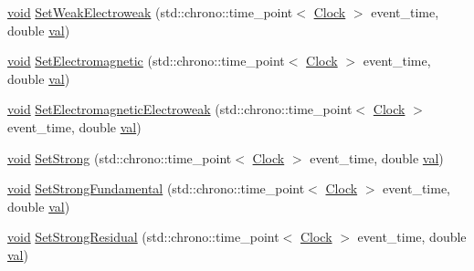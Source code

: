 \begin{DoxyCompactItemize}
\item 
\mbox{\hyperlink{glad_8h_a950fc91edb4504f62f1c577bf4727c29}{void}} \mbox{\hyperlink{class_composite_force_particle_a73a3792ae1c334e74f945fea56083f0b}{Set\+Weak\+Electroweak}} (std\+::chrono\+::time\+\_\+point$<$ \mbox{\hyperlink{universe_8h_a0ef8d951d1ca5ab3cfaf7ab4c7a6fd80}{Clock}} $>$ event\+\_\+time, double \mbox{\hyperlink{glad_8h_a26942fd2ed566ef553eae82d2c109c8f}{val}})
\item 
\mbox{\hyperlink{glad_8h_a950fc91edb4504f62f1c577bf4727c29}{void}} \mbox{\hyperlink{class_composite_force_particle_a476c0d570c3be75c9e186df1ec2a5cda}{Set\+Electromagnetic}} (std\+::chrono\+::time\+\_\+point$<$ \mbox{\hyperlink{universe_8h_a0ef8d951d1ca5ab3cfaf7ab4c7a6fd80}{Clock}} $>$ event\+\_\+time, double \mbox{\hyperlink{glad_8h_a26942fd2ed566ef553eae82d2c109c8f}{val}})
\item 
\mbox{\hyperlink{glad_8h_a950fc91edb4504f62f1c577bf4727c29}{void}} \mbox{\hyperlink{class_composite_force_particle_ad53c5d396b3c56241174a9bd78f9e07a}{Set\+Electromagnetic\+Electroweak}} (std\+::chrono\+::time\+\_\+point$<$ \mbox{\hyperlink{universe_8h_a0ef8d951d1ca5ab3cfaf7ab4c7a6fd80}{Clock}} $>$ event\+\_\+time, double \mbox{\hyperlink{glad_8h_a26942fd2ed566ef553eae82d2c109c8f}{val}})
\item 
\mbox{\hyperlink{glad_8h_a950fc91edb4504f62f1c577bf4727c29}{void}} \mbox{\hyperlink{class_composite_force_particle_a06488ef0457335648b161d3ed746b643}{Set\+Strong}} (std\+::chrono\+::time\+\_\+point$<$ \mbox{\hyperlink{universe_8h_a0ef8d951d1ca5ab3cfaf7ab4c7a6fd80}{Clock}} $>$ event\+\_\+time, double \mbox{\hyperlink{glad_8h_a26942fd2ed566ef553eae82d2c109c8f}{val}})
\item 
\mbox{\hyperlink{glad_8h_a950fc91edb4504f62f1c577bf4727c29}{void}} \mbox{\hyperlink{class_composite_force_particle_a28d835658edcbecf60162475a8cb1ab6}{Set\+Strong\+Fundamental}} (std\+::chrono\+::time\+\_\+point$<$ \mbox{\hyperlink{universe_8h_a0ef8d951d1ca5ab3cfaf7ab4c7a6fd80}{Clock}} $>$ event\+\_\+time, double \mbox{\hyperlink{glad_8h_a26942fd2ed566ef553eae82d2c109c8f}{val}})
\item 
\mbox{\hyperlink{glad_8h_a950fc91edb4504f62f1c577bf4727c29}{void}} \mbox{\hyperlink{class_composite_force_particle_aeba1070d4ec6e52fd8276e38c6a6c2e1}{Set\+Strong\+Residual}} (std\+::chrono\+::time\+\_\+point$<$ \mbox{\hyperlink{universe_8h_a0ef8d951d1ca5ab3cfaf7ab4c7a6fd80}{Clock}} $>$ event\+\_\+time, double \mbox{\hyperlink{glad_8h_a26942fd2ed566ef553eae82d2c109c8f}{val}})
\item 

\end{DoxyCompactItemize}
